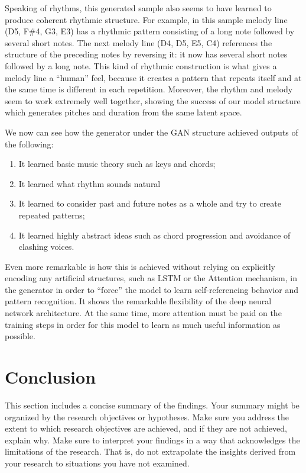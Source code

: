 \documentclass[12pt,oneside]{chicagocapstone}
\providecommand{\tightlist}{%
  \setlength{\itemsep}{0pt}\setlength{\parskip}{0pt}}
\begin{document}
Speaking of rhythms, this generated sample also seems to have learned to produce coherent rhythmic structure. For example, in this sample melody line (D5, F\#4, G3, E3) has a rhythmic pattern consisting of a long note followed by several short notes. The next melody line (D4, D5, E5, C4) references the structure of the preceding notes by reversing it: it now has several short notes followed by a long note. This kind of rhythmic construction is what gives a melody line a ``human'' feel, because it creates a pattern that repeats itself and at the same time is different in each repetition. Moreover, the rhythm and melody seem to work extremely well together, showing the success of our model structure which generates pitches and duration from the same latent space.

We now can see how the generator under the GAN structure achieved outputs of the following:
\begin{enumerate}
\def\labelenumi{\arabic{enumi}.}
\tightlist
\item
  It learned basic music theory such as keys and chords;
\item
  It learned what rhythm sounds natural
\item
  It learned to consider past and future notes as a whole and try to create repeated patterns;
\item
  It learned highly abstract ideas such as chord progression and avoidance of clashing voices.
\end{enumerate}
Even more remarkable is how this is achieved without relying on explicitly encoding any artificial structures, such as LSTM or the Attention mechanism, in the generator in order to ``force'' the model to learn self-referencing behavior and pattern recognition. It shows the remarkable flexibility of the deep neural network architecture. At the same time, more attention must be paid on the training steps in order for this model to learn as much useful information as possible.

\hypertarget{conclusion}{%
\chapter*{Conclusion}\label{conclusion}}

This section includes a concise summary of the findings. Your summary might be organized by the research objectives or hypotheses. Make sure you address the extent to which research objectives are achieved, and if they are not achieved, explain why. Make sure to interpret your findings in a way that acknowledges the limitations of the research. That is, do not extrapolate the insights derived from your research to situations you have not examined.
\end{document}
